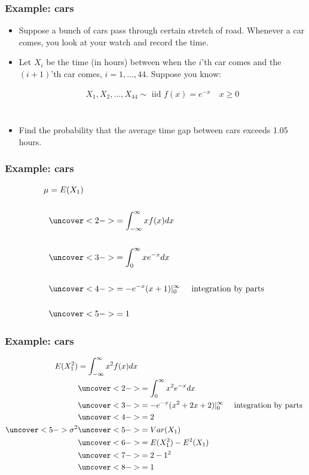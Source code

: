 \documentclass[handout]{beamer}\usepackage{graphicx, color}
\numberwithin{equation}{section}
\begin{document}
\begin{frame}
\frametitle{Example: cars}
\begin{itemize}
\pause \item Suppose a bunch of cars pass through certain stretch of road. Whenever a car comes, you look at your watch and record the time. 
\pause \item Let $X_i$ be the time (in hours) between when the $i$'th car comes and the $(i + 1)$'th car comes, $i = 1, \ldots, 44$. Suppose you know:

\pause \pause \begin{align*}
X_1, X_2, \ldots, X_{44} \sim \text{ iid } f(x) = e^{-x} \quad x \ge 0 \\
\end{align*} $\quad$

\pause \item Find the probability that the average time gap between cars exceeds 1.05 hours.
\end{itemize}
\end{frame}


\begin{frame}
\frametitle{Example: cars}
\begin{align*}
\mu &= E(X_1) \\ \\
&\uncover<2->{= \int_{-\infty}^\infty x f(x) dx} \\ \\
&\uncover<3->{= \int_{0}^\infty x e^{-x} dx} \\ \\
&\uncover<4->{= -e^{-x}(x+1)|_{0}^{\infty} \quad \text{ integration by parts }} \\ \\
&\uncover<5->{ = 1}
\end{align*}
\end{frame}


\begin{frame}
\frametitle{Example: cars}
\begin{align*}
E(X_1^2) &= \int_{-\infty}^\infty x^2 f(x) dx \\ 
&\uncover<2->{= \int_{0}^\infty x^2 e^{-x} dx} \\ 
&\uncover<3->{= -e^{-x}(x^2 + 2x + 2)|_{0}^{\infty} \quad \text{ integration by parts }} \\ 
&\uncover<4->{ = 2} \\
\uncover<5->{\sigma^2} & \uncover<5->{= Var(X_1)} \\
&\uncover<6->{= E(X_1^2) - E^2(X_1)} \\
& \uncover<7->{= 2 - 1^2} \\
& \uncover<8->{= 1}
\end{align*}
\end{frame}
\end{document}
